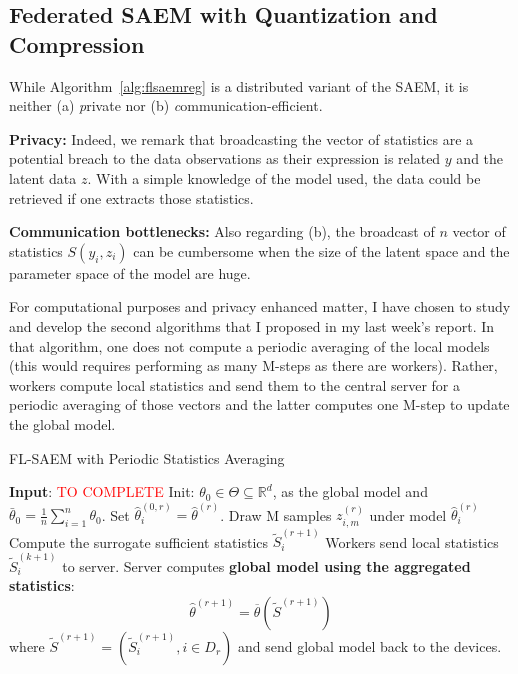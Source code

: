 \documentclass[11pt]{article}
\theoremstyle{t}
\begin{document}
\subsection{Federated SAEM with Quantization and Compression}


While Algorithm~\ref{alg:flsaemreg} is a distributed variant of the SAEM, it is neither (a) \emph private nor (b) \emph communication-efficient.

\textbf{Privacy:} Indeed, we remark that broadcasting the vector of statistics are a potential breach to the data observations as their expression is related $y$ and the latent data $z$. With a simple knowledge of the model used, the data could be retrieved if one extracts those statistics.

\textbf{Communication bottlenecks:} Also regarding (b), the broadcast of $n$ vector of statistics $S(y_i,z_i)$ can be cumbersome when the size of the latent space and the parameter space of the model are huge.


For computational purposes and privacy enhanced matter, I have chosen to study and develop the second algorithms that I proposed in my last week's report.
In that algorithm, one does not compute a periodic averaging of the local models (this would requires performing as many M-steps as there are workers).
Rather, workers compute local statistics and send them to the central server for a periodic averaging of those vectors and the latter computes one M-step to update the global model.

\begin{algorithm}[H]
\caption{FL-SAEM with Periodic Statistics Averaging} \label{alg:flsaemreg}
\begin{algorithmic}[1]
\STATE \textbf{Input}: \textcolor{red}{TO COMPLETE}
\STATE Init: $\theta_{0} \in \Theta \subseteq \mathbb R^d $, as the global model and $\bar{\theta}_0 =  \frac{1}{n} \sum_{i=1}^n \theta_0$.
\STATE Set $\hat{\theta}^{(0,r)}_i = \hat{\theta}^{(r)}$.
\STATE Draw M samples $z_{i,m}^{(r)}$ under model $\hat{\theta}^{(r)}_i$ \label{line:samplingreg}
\STATE Compute the surrogate sufficient statistics $\tilde{S}_{i}^{(r+1)}$ \label{line:computereg}
\STATE Workers send local statistics $\tilde{S}_{i}^{(k+1)}$ to server.
\ENDFOR
\STATE Server computes \textbf{global model using the aggregated statistics}:
$$
\hat{\theta}^{(r+1)} = \overline{\theta}( \tilde{S}^{(r+1)}) 
$$
where $\tilde{S}^{(r+1)} = (\tilde{S}_i^{(r+1)}, i \in D_r)$  and send global model back to the devices. 
\ENDFOR
\end{algorithmic}
\end{algorithm}
\end{document}
